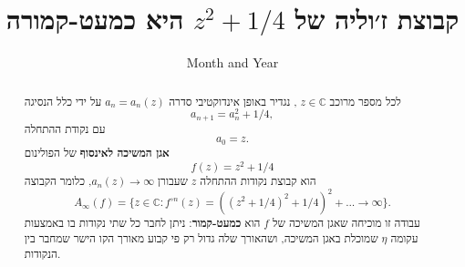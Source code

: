 \documentclass[11pt,titlepage]{article}
\title{קבוצת ז׳וליה של $z^2+1/4$ היא כמעט-קמורה}
\date{Month and Year}
\begin{document}
\begin{abstract}
{\large

    לכל מספר מרוכב
    $z \in \mathbb C$
    ,
    נגדיר באופן אינדוקטיבי סדרה
$a_n=a_n(z)$
 על ידי
 כלל הנסיגה
    $$a_{n+1} = a_n ^2 + 1/4,$$
    עם נקודת ההתחלה
        $$a_0 = z.$$ 
    \textbf{אגן המשיכה לאינסוף}
    של הפולינום
    $$f(z)=z^2+1/4$$        
    הוא
    קבוצת נקודות ההתחלה 
    $z$
    שעבורן
    $a_n(z) \to \infty$,
    כלומר
הקבוצה
     $$A_\infty(f)=\{z\in \mathbb C: f^{\circ n}(z)=((z^2+1/4)^2+1/4)^2+\dots \to \infty\}.$$
עבודה זו מוכיחה שאגן המשיכה של 
$f$
 הוא 
\textbf{כמעט-קמור}:
ניתן לחבר כל שתי נקודות בו באמצעות עקומה
$\eta$
שמוכלת באגן המשיכה, 
ושהאורך שלה גדול רק פי קבוע מאורך הקו הישר שמחבר בין הנקודות.

    
    
     
    }
    
\end{abstract}
\end{document}
